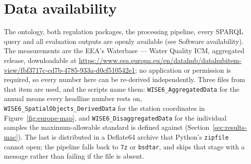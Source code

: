 \documentclass[preprint,review,12pt,authoryear]{elsarticle}
\begin{document}
\section*{Data availability}
The ontology, both regulation packages, the processing pipeline, every SPARQL
query and all evaluation outputs are openly available (see Software
availability). The measurements are the EEA's Waterbase --- Water Quality ICM,
aggregated release, downloadable at
\url{https://www.eea.europa.eu/en/datahub/datahubitem-view/fbf3717c-cd7b-4785-933a-d0cf510542e1};
no application or permission is required, so every number here can be
re-derived independently. Three files from that item are used, and the scripts
name them: \texttt{WISE6\_AggregatedData} for the annual means every
headline number rests on, \texttt{WISE6\_SpatialObjects\_DerivedData} for the
station coordinates in Figure~\ref{fig:europe-map}, and
\texttt{WISE6\_DisaggregatedData} for the individual samples the
maximum-allowable standard is defined against (Section~\ref{sec:results-mac}).
The last is distributed in a Deflate64 archive that Python's \texttt{zipfile}
cannot open; the pipeline falls back to \texttt{7z} or \texttt{bsdtar}, and
skips that stage with a message rather than failing if the file is absent.



\end{document}
